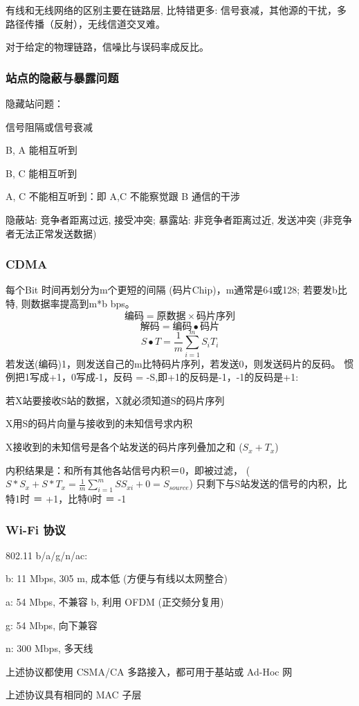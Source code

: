 \documentclass[UTF8,cs4size]{ctexart}
\begin{document}
有线和无线网络的区别主要在链路层, 比特错更多: 
信号衰减，其他源的干扰，多路径传播（反射），无线信道交叉难。

对于给定的物理链路，信噪比与误码率成反比。
\subsubsection{站点的隐蔽与暴露问题}
隐藏站问题：
\begin{compactitem}
  \item 信号阻隔或信号衰减
  \item B, A 能相互听到
  \item B, C 能相互听到
  \item A, C 不能相互听到：即 A,C 不能察觉跟 B 通信的干涉
\end{compactitem}

隐蔽站: 竞争者距离过远, 接受冲突;
暴露站: 非竞争者距离过近, 发送冲突 (非竞争者无法正常发送数据)
\subsubsection{CDMA}
每个Bit 时间再划分为m个更短的间隔 (码片Chip)，m通常是64或128;
若要发b比特, 则数据率提高到m*b bps。
$$\text{编码} = \text{原数据} \times \text{码片序列}$$
$$\text{解码} = \text{编码} \bullet \text{码片}$$
$$S \bullet T = \frac{1}{m} \sum_{i=1}^m S_i T_i$$
若发送(编码)1，则发送自己的m比特码片序列，若发送0，则发送码片的反码。
惯例把1写成+1，0写成-1，反码 = -S,即+1的反码是-1，-1的反码是+1:
\begin{compactitem}
  \item 若X站要接收S站的数据，X就必须知道S的码片序列
  \item X用S的码片向量与接收到的未知信号求内积
  \item X接收到的未知信号是各个站发送的码片序列叠加之和 ($S_x + T_x$)
  \item 内积结果是：和所有其他各站信号内积＝0，即被过滤， ($S*S_x+S*T_x = \frac{1}{m}\sum_{i=1}^m SS_{xi} + 0 = S_{source}$)
  只剩下与S站发送的信号的内积，比特1时 ＝ +1，比特0时 ＝ -1
\end{compactitem}
\subsubsection{Wi-Fi 协议}
802.11 b/a/g/n/ac:
\begin{compactitem}
  \item b: 11 Mbps, 305 m, 成本低 (方便与有线以太网整合)
  \item a: 54 Mbps, 不兼容 b, 利用 OFDM (正交频分复用)
  \item g: 54 Mbps, 向下兼容
  \item n: 300 Mbps, 多天线
  \item 上述协议都使用 CSMA/CA 多路接入，都可用于基站或 Ad-Hoc 网
  \item 上述协议具有相同的 MAC 子层
\end{compactitem}
\end{document}
